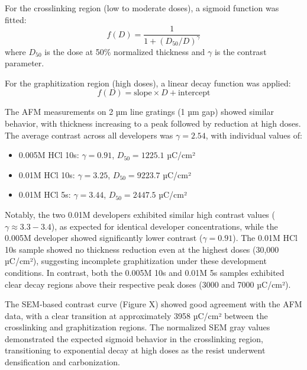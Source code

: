 For the crosslinking region (low to moderate doses), a sigmoid function was fitted:
\begin{equation}
f(D) = \frac{1}{1 + (D_{50}/D)^{\gamma}}
\end{equation}
where $D_{50}$ is the dose at 50\% normalized thickness and $\gamma$ is the contrast parameter.

For the graphitization region (high doses), a linear decay function was applied:
\begin{equation}
f(D) = \text{slope} \times D + \text{intercept}
\end{equation}

The AFM measurements on 2 µm line gratings (1 µm gap) showed similar behavior, with thickness increasing to a peak followed by reduction at high doses. The average contrast across all developers was $\gamma = 2.54$, with individual values of:
\begin{itemize}
    \item 0.005M HCl 10s: $\gamma = 0.91$, $D_{50} = 1225.1$ µC/cm²
    \item 0.01M HCl 10s: $\gamma = 3.25$, $D_{50} = 9223.7$ µC/cm²
    \item 0.01M HCl 5s: $\gamma = 3.44$, $D_{50} = 2447.5$ µC/cm²
\end{itemize}

Notably, the two 0.01M developers exhibited similar high contrast values ($\gamma \approx 3.3-3.4$), as expected for identical developer concentrations, while the 0.005M developer showed significantly lower contrast ($\gamma = 0.91$). The 0.01M HCl 10s sample showed no thickness reduction even at the highest doses (30,000 µC/cm²), suggesting incomplete graphitization under these development conditions. In contrast, both the 0.005M 10s and 0.01M 5s samples exhibited clear decay regions above their respective peak doses (3000 and 7000 µC/cm²).

The SEM-based contrast curve (Figure X) showed good agreement with the AFM data, with a clear transition at approximately 3958 µC/cm² between the crosslinking and graphitization regions. The normalized SEM gray values demonstrated the expected sigmoid behavior in the crosslinking region, transitioning to exponential decay at high doses as the resist underwent densification and carbonization.
